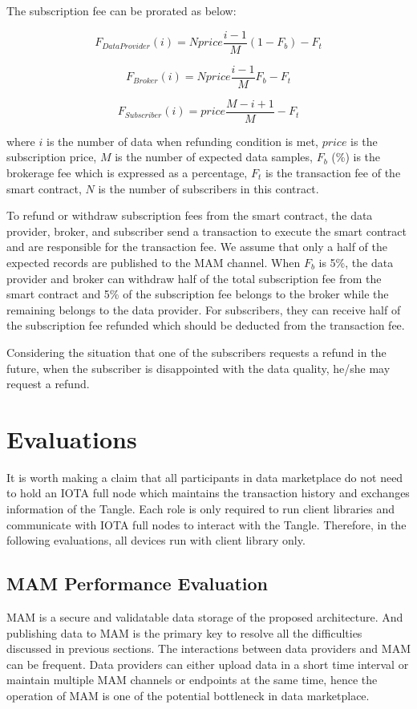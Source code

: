 \documentclass[conference]{IEEEtran}
\begin{document}
The subscription fee can be prorated as below:

\begin{equation}
    F_{DataProvider}(i) = N price \frac{i-1}{M} (1-F_{b}) -F_{t}
\end{equation}

\begin{equation}
    F_{Broker}(i) = N price \frac{i-1}{M} F_{b} -F_{t}
\end{equation}

\begin{equation}
    F_{Subscriber}(i) = price \frac{M-i+1}{M} -F_{t}
\end{equation}

where $i$ is the number of data when refunding condition is met, $price$  is the subscription price, $M$ is the number of expected data samples, $F_{b}$ (\%) is the brokerage fee which is expressed as a percentage, $F_{t}$ is the transaction fee of the smart contract, $N$ is the number of subscribers in this contract.

To refund or withdraw subscription fees from the smart contract, the data provider, broker, and subscriber send a transaction to execute the smart contract and are responsible for the transaction fee. We assume that only a half of the expected records are published to the MAM channel. When $F_{b}$ is 5\%, the data provider and broker can withdraw half of the total subscription fee from the smart contract and 5\% of the subscription fee belongs to the broker while the remaining belongs to the data provider. For subscribers, they can receive half of the subscription fee refunded which should be deducted from the transaction fee.

Considering the situation that one of the subscribers requests a refund in the future, when the subscriber is disappointed with the data quality, he/she may request a refund.

\section{Evaluations}
It is worth making a claim that all participants in data marketplace do not need to hold an IOTA full node which maintains the transaction history and exchanges information of the Tangle. Each role is only required to run client libraries and communicate with IOTA full nodes to interact with the Tangle. Therefore, in the following evaluations, all devices run with client library only.

\subsection{MAM Performance Evaluation}
MAM is a secure and validatable data storage of the proposed architecture. And publishing data to MAM is the primary key to resolve all the difficulties discussed in previous sections. The interactions between data providers and MAM can be frequent. Data providers can either upload data in a short time interval or maintain multiple MAM channels or endpoints at the same time, hence the operation of MAM is one of the potential bottleneck in data marketplace.
\end{document}
